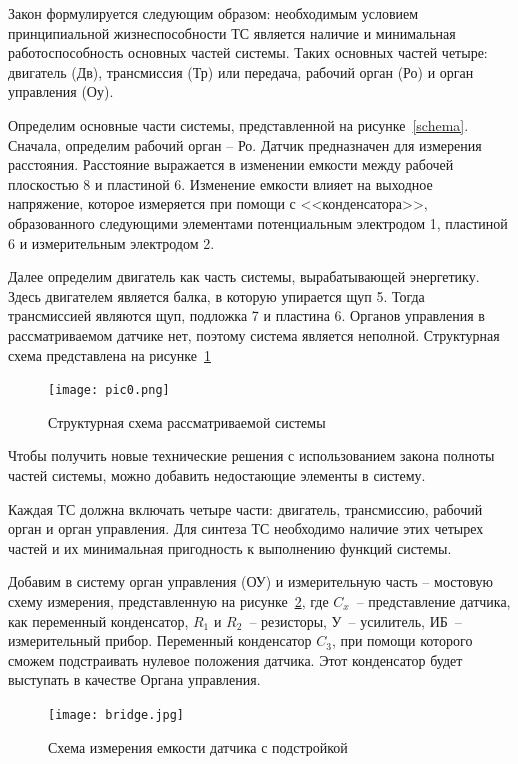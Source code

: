 Закон формулируется следующим образом: необходимым условием
принципиальной жизнеспособности ТС является наличие и минимальная
работоспособность основных частей системы. Таких основных частей
четыре: двигатель (Дв), трансмиссия (Тр) или передача, рабочий орган (Ро) и орган управления (Оу).

Определим основные части системы, представленной на рисунке~\ref{schema}. Сначала, определим рабочий орган -- Ро. Датчик предназначен для измерения расстояния. Расстояние выражается в изменении емкости между рабочей плоскостью 8 и пластиной 6. Изменение емкости влияет на выходное напряжение, которое измеряется при помощи с <<конденсатора>>, образованного следующими элементами потенциальным электродом 1, пластиной 6 и измерительным электродом 2. 

Далее определим двигатель как часть системы, вырабатывающей энергетику. Здесь двигателем является балка, в которую упирается щуп 5. Тогда трансмиссией являются щуп, подложка 7 и пластина 6. Органов управления в рассматриваемом датчике нет, поэтому система является неполной. Структурная схема представлена на рисунке~\ref{first_sys}

\begin{figure}[h]
	\centering
	\texttt{[image: pic0.png]}
	\caption{Структурная схема рассматриваемой системы}
	\label{first_sys}
\end{figure}

Чтобы получить новые технические решения с использованием закона полноты частей  системы, можно добавить недостающие элементы в систему. 

Каждая ТС должна включать четыре части: двигатель, трансмиссию, рабочий орган и орган управления. Для синтеза ТС необходимо наличие этих четырех частей и их минимальная пригодность к выполнению функций системы.

Добавим в систему орган управления (ОУ) и измерительную часть -- мостовую схему измерения, представленную на рисунке~\ref{im:bridge}, где $C_x$~-- представление датчика, как переменный конденсатор, $R_1$ и $R_2$~-- резисторы, У~-- усилитель, ИБ~-- измерительный прибор. Переменный конденсатор $C_3$, при помощи которого сможем подстраивать нулевое положения датчика. Этот конденсатор будет выступать в качестве Органа управления.


\begin{figure}[h]
	\centering
	\texttt{[image: bridge.jpg]}
	\caption{Схема измерения емкости датчика с подстройкой}
	\label{im:bridge}
\end{figure}


